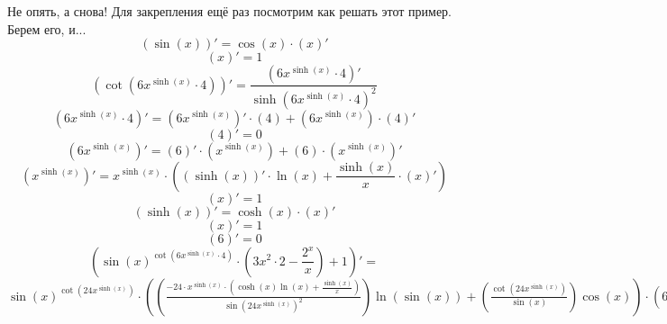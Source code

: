 \documentclass[a4paper,12pt]{article} %
\begin{document}
Не опять, а снова! Для закрепления ещё раз посмотрим как решать этот пример. Берем его, и...\newline $$ \left( \sin \left( x\right) \right)' =  \cos \left( x\right) \cdot  \left( x \right)'$$
 \newline 
\newline $$ \left( x \right)' = 1$$
 \newline 
\newline $$ \left( \cot \left(   6  x^{ \sinh \left( x\right)}\cdot  4\right) \right)' = \frac{ \left(   6  x^{ \sinh \left( x\right)}\cdot  4 \right)'}{  \sinh \left(   6  x^{ \sinh \left( x\right)}\cdot  4\right)^{ 2}}$$
 \newline 
\newline $$ \left(   6  x^{ \sinh \left( x\right)}\cdot  4 \right)' =  \left(  6  x^{ \sinh \left( x\right)} \right)' \cdot \left( 4 \right) +  \left(  6  x^{ \sinh \left( x\right)} \right) \cdot \left( 4 \right)'$$
 \newline 
\newline $$ \left( 4 \right)' = 0$$
 \newline 
\newline $$ \left(  6  x^{ \sinh \left( x\right)} \right)' =  \left( 6 \right)' \cdot \left(  x^{ \sinh \left( x\right)} \right) +  \left( 6 \right) \cdot \left(  x^{ \sinh \left( x\right)} \right)'$$
 \newline 
\newline $$ \left(  x^{ \sinh \left( x\right)} \right)' =   x^{ \sinh \left( x\right)} \cdot \left( \left( \sinh \left( x\right) \right)' \cdot  \ln \left( x\right) +  \frac{ \sinh \left( x\right)}{ x} \cdot \left( x \right)' \right)$$
 \newline 
\newline $$ \left( x \right)' = 1$$
 \newline 
\newline $$ \left( \sinh \left( x\right) \right)' =  \cosh \left( x\right) \cdot  \left( x \right)'$$
 \newline 
\newline $$ \left( x \right)' = 1$$
 \newline 
\newline $$ \left( 6 \right)' = 0$$
 \newline{} $$
 \left(    \sin \left( x\right)^{ \cot \left(   6  x^{ \sinh \left( x\right)}\cdot  4\right)}\cdot \left(    3  x^{ 2}\cdot  2- \frac{  2^{ x}}{ x}\right)+ 1 \right)'= $$ \newline $     \sin \left( x\right)^{ \cot \left(  24  x^{ \sinh \left( x\right)}\right)}\cdot \left(  \left( \frac{ -  24\cdot    x^{ \sinh \left( x\right)}\cdot \left(   \cosh \left( x\right) \ln \left( x\right)+ \frac{ \sinh \left( x\right)}{ x}\right)}{  \sin \left(  24  x^{ \sinh \left( x\right)}\right)^{ 2}}\right) \ln \left( \sin \left( x\right)\right)+ \left( \frac{ \cot \left(  24  x^{ \sinh \left( x\right)}\right)}{ \sin \left( x\right)}\right) \cos \left( x\right)\right)\cdot \left(   6  x^{ 2}- \frac{  2^{ x}}{ x}\right)+   \sin \left( x\right)^{ \cot \left(  24  x^{ \sinh \left( x\right)}\right)}\cdot \left(   12 x- \frac{     2^{ x} \ln \left( 2\right)\cdot  x-  2^{ x}}{  x^{ 2}}\right)$
\end{document}
